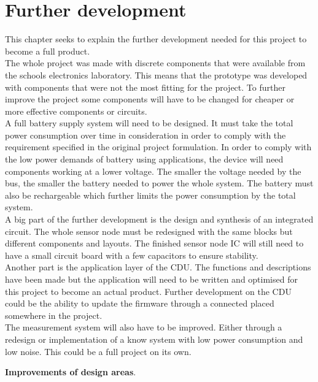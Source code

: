 \chapter{Further development}
This chapter seeks to explain the further development needed for this project to become a full product.\\

The whole project was made with discrete components that were available from the schools electronics laboratory. This means that the prototype was developed with components that were not the most fitting for the project. To further improve the project some components will have to be changed for cheaper or more effective components or circuits.\\

A full battery supply system will need to be designed. It must take the total power consumption over time in consideration in order to comply with the requirement specified in the original project formulation. In order to comply with the low power demands of battery using applications, the device will need components working at a lower voltage. The smaller the voltage needed by the bus, the smaller the battery needed to power the whole system. The battery must also be rechargeable which further limits the power consumption by the total system.\\

A big part of the further development is the design and synthesis of an integrated circuit. The whole sensor node must be redesigned with the same blocks but different components and layouts. The finished sensor node IC will still need to have a small circuit board with a few capacitors to ensure stability.\\

Another part is the application layer of the CDU. The functions and descriptions have been made but the application will need to be written and optimised for this project to become an actual product. Further development on the CDU could be the ability to update the firmware through a connected placed somewhere in the project.\\

The measurement system will also have to be improved. Either through a redesign or implementation of a know system with low power consumption and low noise. This could be a full project on its own.

\textbf{Improvements of design areas}.\\
